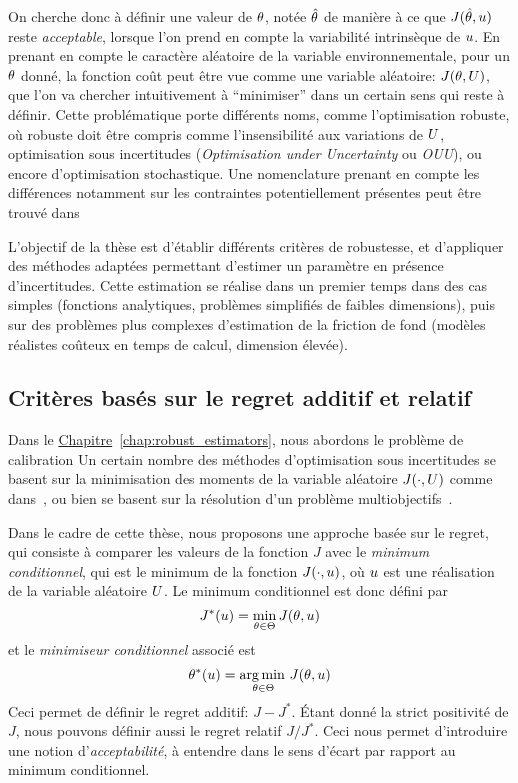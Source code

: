 \documentclass[../../Main_ManuscritThese.tex]{subfiles}
\newcommand{\frchap}[1]{\hyperref[#1]{Chapitre}~\ref{#1}}
\begin{document}
On cherche donc à définir une valeur de $\theta$, notée $\hat{\theta}$ de
manière à ce que $J(\hat{\theta}, u)$ reste \emph{acceptable}, lorsque
l'on prend en compte la variabilité intrinsèque de $u$.
En prenant en compte le caractère aléatoire de la variable
environnementale, pour un $\theta$ donné, la fonction coût peut être vue
comme une variable aléatoire: $J(\theta,U)$, que l'on va chercher
intuitivement à ``minimiser'' dans un certain sens qui reste à
définir.  Cette problématique porte différents noms, comme
l'optimisation robuste, où robuste doit être compris comme
l'insensibilité aux variations de $U$, optimisation sous
incertitudes (\emph{Optimisation under Uncertainty} ou \emph{OUU}), ou encore
d'optimisation stochastique. Une nomenclature prenant en compte les
différences notamment sur les contraintes potentiellement présentes
peut être trouvé dans~\cite{lelievre_consideration_2016}


L'objectif de la thèse est d'établir différents critères de
robustesse, et d'appliquer des méthodes adaptées permettant d'estimer
un paramètre en présence d'incertitudes. Cette estimation se réalise
dans un premier temps dans des cas simples (fonctions analytiques,
problèmes simplifiés de faibles dimensions), puis sur des problèmes
plus complexes d'estimation de la friction de fond (modèles réalistes
coûteux en temps de calcul, dimension élevée).

\subsection*{Critères basés sur le regret additif et relatif}
Dans le \frchap{chap:robust_estimators}, nous abordons le problème de
calibration 
Un certain nombre des méthodes
d'optimisation sous incertitudes se basent sur la minimisation des
moments de la variable aléatoire $J(\mathbf{\cdot}, U)$ comme
dans~\cite{lehman_designing_2004,janusevskis_simultaneous_2010}, ou
bien se basent sur la résolution d'un problème
multiobjectifs~\cite{baudoui_optimisation_2012,ribaud_krigeage_2018}.

Dans le cadre de cette thèse, nous proposons une approche basée sur le
regret, qui consiste à comparer les valeurs de la fonction $J$ avec le
\emph{minimum conditionnel}, qui est le minimum de la fonction
$J(\cdot, u)$, où $u$ est une réalisation de la variable aléatoire
$U$. Le minimum conditionnel est donc défini par
\begin{equation*}
  \label{eq:Jstar}
  J^*(u) = \min_{\theta\in\Theta} J(\theta,u)
\end{equation*}
et le \emph{minimiseur conditionnel} associé est
\begin{equation*}
  \label{eq:Kstar}
  \theta^*(u) = \operatorname*{arg\,min \,}_{\theta\in \Theta}J(\theta,u)
\end{equation*}
Ceci permet de définir le regret additif: $J - J^*$. Étant donné la
strict positivité de $J$, nous pouvons définir aussi le regret relatif
$J/J^*$. Ceci nous permet d'introduire une notion
d'\emph{acceptabilité}, à entendre dans le sens d'écart par rapport au
minimum conditionnel.
\end{document}
